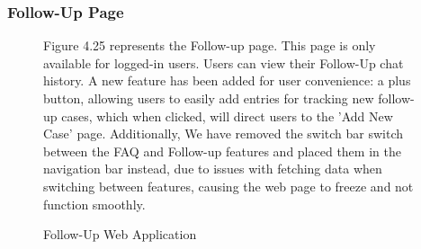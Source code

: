 \documentclass[12pt,oneside,openright,a4paper]{cpe-english-project}
\begin{document}
        \subsubsection{Follow-Up Page}
          \begin{figure}[!h]
            \centering
            \caption{Follow-Up Web Application}\label{fig:WebAppFollowUp}
            \begin{flushleft}
              \qquad Figure 4.25 represents the Follow-up page. This page is only available for logged-in users. Users can view their Follow-Up chat history. A new feature has been added for user convenience: a plus button, allowing users to easily add entries for tracking new follow-up cases, which when clicked, will direct users to the 'Add New Case' page. Additionally, We have removed the switch bar switch between  the FAQ and Follow-up features and placed them in the navigation bar instead, due to issues with fetching data when switching between features, causing the web page to freeze and not function smoothly.\par
            \end{flushleft}        
          \end{figure}
\end{document}
